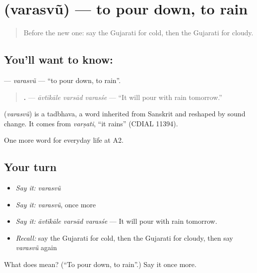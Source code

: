 \section[\texorpdfstring{\gu{વરસવું} (varasvũ)}{વરસવું (varasvũ)}]{ (varasvũ) — to pour down, to rain}

\label{lesson:GU-C213-varasvu}



\begin{quote}
Before the new one: say the Gujarati for cold, then the Gujarati for cloudy.
\end{quote}

\subsection*{You'll want to know: }
\textbf{} — \emph{varasvũ} — \textquotedblleft{}to pour down, to rain\textquotedblright{}.

\begin{quote}
\textbf{  .} — \emph{āvtīkāle varsād varasśe} — \textquotedblleft{}It will pour with rain tomorrow.\textquotedblright{}
\end{quote}

\begin{cousinweb}
\textbf{} (\emph{varasvũ}) is a tadbhava, a word inherited from Sanskrit and reshaped by sound change. It comes from \emph{varṣati}, \textquotedblleft{}it rains\textquotedblright{} (CDIAL 11394).
\end{cousinweb}

\begin{grammarlens}[title={What you've built}]
One more word for everyday life at A2.
\end{grammarlens}

\subsection*{Your turn}
\begin{itemize}
\raggedright
  \item \emph{Say it:} \emph{varasvũ}
  \item \emph{Say it:} \emph{varasvũ}, once more
  \item \emph{Say it:} \emph{āvtīkāle varsād varasśe} — It will pour with rain tomorrow.
  \item \emph{Recall:} say the Gujarati for cold, then the Gujarati for cloudy, then say \emph{varasvũ} again
\end{itemize}

\begin{tcolorbox}[breakable,colback=teal!4,colframe=teal!35!black,title={Before you move on}]
What does  mean? (\textquotedblleft{}To pour down, to rain\textquotedblright{}.) Say it once more.
\end{tcolorbox}
